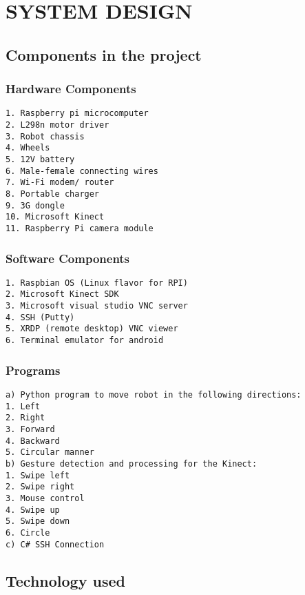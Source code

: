 \chapter{SYSTEM DESIGN} %


\section{Components in the project}
\subsection{Hardware Components}
\begin{verbatim}
1. Raspberry pi microcomputer
2. L298n motor driver
3. Robot chassis
4. Wheels 
5. 12V battery
6. Male-female connecting wires
7. Wi-Fi modem/ router
8. Portable charger
9. 3G dongle
10. Microsoft Kinect 
11. Raspberry Pi camera module
\end{verbatim}
\subsection{Software Components}
\begin{verbatim}
1. Raspbian OS (Linux flavor for RPI)
2. Microsoft Kinect SDK 
3. Microsoft visual studio VNC server
4. SSH (Putty)
5. XRDP (remote desktop) VNC viewer 
6. Terminal emulator for android 
\end{verbatim}
\subsection{Programs}
\begin{verbatim}
a) Python program to move robot in the following directions:
1. Left
2. Right
3. Forward
4. Backward
5. Circular manner
b) Gesture detection and processing for the Kinect:
1. Swipe left
2. Swipe right
3. Mouse control 
4. Swipe up
5. Swipe down
6. Circle
c) C# SSH Connection 
\end{verbatim}

\section{Technology used}
